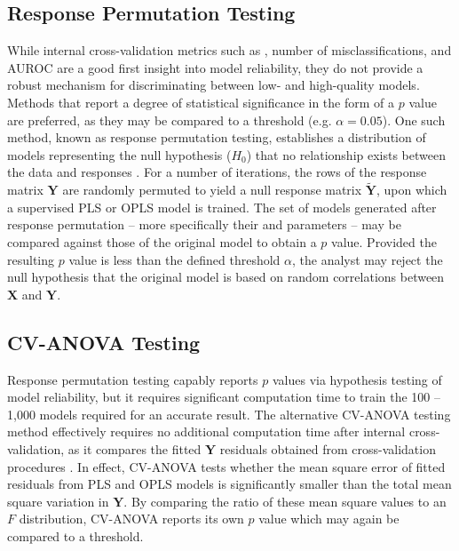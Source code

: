 \subsection{Response Permutation Testing}

\begin{doublespace}
While internal cross-validation metrics such as \qsq{}, number of
misclassifications, and AUROC \cite{westerhuis:metab2008a} are a good first
insight into model reliability, they do not provide a robust mechanism for
discriminating between low- and high-quality models. Methods that report a
degree of statistical significance in the form of a $p$ value are preferred,
as they may be compared to a threshold (e.g. $\alpha = 0.05$). One such method,
known as response permutation testing, establishes a distribution of models
representing the null hypothesis ($H_0$) that no relationship exists between
the data and responses \cite{westerhuis:metab2008a}. For a number of
iterations, the rows of the response matrix $\mathbf{Y}$ are randomly permuted
to yield a null response matrix $\tilde{\mathbf{Y}}$, upon which a supervised
PLS or OPLS model is trained. The set of models generated after response
permutation -- more specifically their \rsq{} and \qsq{} parameters -- may be
compared against those of the original model to obtain a $p$ value. Provided
the resulting $p$ value is less than the defined threshold $\alpha$, the
analyst may reject the null hypothesis that the original model is based on
random correlations between $\mathbf{X}$ and $\mathbf{Y}$.
\end{doublespace}

\subsection{CV-ANOVA Testing}

\begin{doublespace}
Response permutation testing capably reports $p$ values via hypothesis testing
of model reliability, but it requires significant computation time to train
the 100 -- 1,000 models required for an accurate result. The alternative
CV-ANOVA testing method effectively requires no additional computation time
after internal cross-validation, as it compares the fitted $\mathbf{Y}$
residuals obtained from cross-validation procedures \cite{eriksson:jchemo2008}.
In effect, CV-ANOVA tests whether the mean square error of fitted residuals
from PLS and OPLS models is significantly smaller than the total mean square
variation in $\mathbf{Y}$. By comparing the ratio of these mean square values
to an $F$ distribution, CV-ANOVA reports its own $p$ value which may again be
compared to a threshold.
\end{doublespace}


